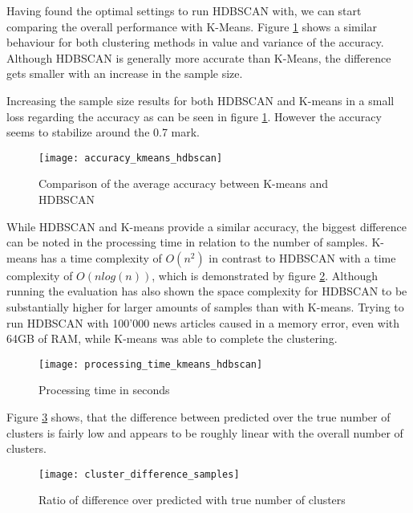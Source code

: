 Having found the optimal settings to run HDBSCAN with, we can start comparing the overall performance with K-Means. Figure \ref{fig:accuracy_kmeans_hdbscan} shows  a similar behaviour for both clustering methods in value and variance of the accuracy. Although HDBSCAN is generally more accurate than K-Means, the difference gets smaller with an increase in the sample size. 

Increasing the sample size results for both HDBSCAN and K-means in a small loss regarding the accuracy as can be seen in figure \ref{fig:accuracy_kmeans_hdbscan}. However the accuracy seems to stabilize around the 0.7 mark.

\begin{figure}[h]
    \centering
    \texttt{[image: accuracy\_kmeans\_hdbscan]}
    \caption{Comparison of the average accuracy between K-means and HDBSCAN}
    \label{fig:accuracy_kmeans_hdbscan}
\end{figure}

While HDBSCAN and K-means provide a similar accuracy, the biggest difference can be noted in the processing time in relation to the number of samples. K-means has a time complexity of $O(n^2)$ in contrast to HDBSCAN with a time complexity of $O(nlog(n))$, which is demonstrated by figure \ref{fig:processing_time_kmeans_hdbscan}. Although running the evaluation has also shown the space complexity for HDBSCAN to be substantially higher for larger amounts of samples than with K-means. Trying to run HDBSCAN with 100'000 news articles caused in a memory error, even with 64GB of RAM, while K-means was able to complete the clustering.


\begin{figure}[h]
    \centering
    \texttt{[image: processing\_time\_kmeans\_hdbscan]}
    \caption{Processing time in seconds }
    \label{fig:processing_time_kmeans_hdbscan}
\end{figure}

Figure \ref{fig:cluster_difference_samples} shows, that the difference between predicted over the true number of clusters is fairly low and appears to be roughly linear with the overall number of clusters.  

\begin{figure}[h]
    \centering
    \texttt{[image: cluster\_difference\_samples]}
    \caption{Ratio of difference over predicted with true number of clusters}
    \label{fig:cluster_difference_samples}
\end{figure}

